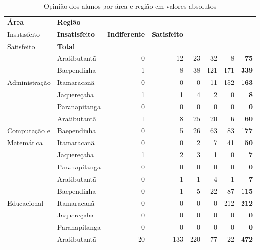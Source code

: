 \begin{table}[h]
\scriptsize
\centering
\caption{Opinião dos alunos por área e região em valores absolutos}
\vspace{0.5em}
\label{tabela:q15a}
\begin{tabular}{llrrrrrr}
\toprule
\textbf{Área} & \textbf{Região} &  \textbf{\specialcell{c}{Muito\\Insatisfeito}} &  \textbf{Insatisfeito} &  \textbf{ Indiferente} &  \textbf{ Satisfeito} & \textbf{\specialcell{c}{Muito\\Satisfeito}} & \textbf{Total} \\
   \midrule
					& Aratibutantã  &   0 &  12 &  23 &  32 &   8 & \textbf{75}\\ 
                    & Baependinha   &   1 &   8 &  38 & 121 & 171 & \textbf{339}\\ 
   Administração    & Itamaracanã   &   0 &   0 &   0 &  11 & 152 & \textbf{163}\\ 
                    & Jaquereçaba   &   1 &   1 &   4 &   2 &   0 & \textbf{8}\\ 
                    & Paranapitanga &   0 &   0 &   0 &   0 &   0 & \textbf{0}\\ 
\midrule
					& Aratibutantã  &   1 &   8 &  25 &  20 &   6 & \textbf{60}\\ 
	Computação e    & Baependinha   &   0 &   5 &  26 &  63 &  83 & \textbf{177}\\ 
	Matemática  	& Itamaracanã   &   0 &   0 &   2 &   7 &  41 & \textbf{50}\\ 
					& Jaquereçaba   &   1 &   2 &   3 &   1 &   0 & \textbf{7}\\ 
                    & Paranapitanga	&   0 &   0 &   0 &   0 &   0 & \textbf{0}\\ 
\midrule
					& Aratibutantã  &   0 &   1 &   1 &   4 &   1 & \textbf{7}\\ 
                    & Baependinha   &   0 &   1 &   5 &  22 &  87 & \textbf{115}\\ 
  Educacional       & Itamaracanã   &   0 &   0 &   0 &   0 & 212 & \textbf{212}\\ 
                    & Jaquereçaba   &   0 &   0 &   0 &   0 &   0 & \textbf{0}\\ 
                    & Paranapitanga &   0 &   0 &   0 &   0 &   0 & \textbf{0}\\ 
\midrule			
					& Aratibutantã  &  20 & 133 & 220 &  77 &  22 & \textbf{472}\\ 

\end{tabular}
\end{table}
